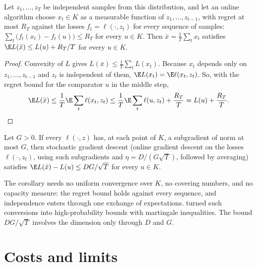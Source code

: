 \begin{refsection}
\begin{theorem}\label{thm:regret:otb}
Let $z_1,\dots,z_T$ be independent samples from this distribution, and let an online algorithm choose $x_t\in K$ as a measurable function of $z_1,\dots,z_{t-1}$, with regret at most $R_T$ against the losses $f_t=\ell(\cdot,z_t)$ for every sequence of samples: $\sum_t\bigl(f_t(x_t)-f_t(u)\bigr)\le R_T$ for every $u\in K$. Then $\bar x=\frac1T\sum_tx_t$ satisfies $\E L(\bar x)\le L(u)+R_T/T$ for every $u\in K$.
\end{theorem}

\begin{proof}
Convexity of $L$ gives $L(\bar x)\le\frac1T\sum_tL(x_t)$. Because $x_t$ depends only on $z_1,\dots,z_{t-1}$ and $z_t$ is independent of them, $\E L(x_t)=\E\ell(x_t,z_t)$. So, with the regret bound for the comparator $u$ in the middle step,
\[
\E L(\bar x)\le\frac1T\E\sum_t\ell(x_t,z_t)\le\frac1T\E\sum_t\ell(u,z_t)+\frac{R_T}T=L(u)+\frac{R_T}T .\qedhere
\]
\end{proof}

\begin{corollary}\label{cor:regret:sgd}
Let $G>0$. If every $\ell(\cdot,z)$ has, at each point of $K$, a subgradient of norm at most $G$, then stochastic gradient descent (online gradient descent on the losses $\ell(\cdot,z_t)$, using such subgradients and $\eta=D/(G\sqrt T)$, followed by averaging) satisfies $\E L(\bar x)-L(u)\le DG/\sqrt T$ for every $u\in K$.
\end{corollary}

The corollary needs no uniform convergence over $K$, no covering numbers, and no capacity measure: the regret bound holds against every sequence, and independence enters through one exchange of expectations. \textcite{CesaBianchiConconiGentile2004} turned such conversions into high-probability bounds with martingale inequalities. The bound $DG/\sqrt T$ involves the dimension only through $D$ and $G$.

\section{Costs and limits}\label{sec:regret:costs}


\end{refsection}

